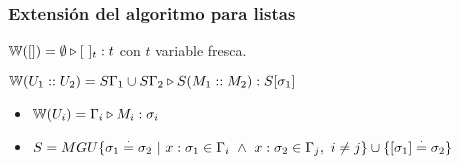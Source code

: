 \subsubsection{Extensión del algoritmo para listas}
$\mathbb{W}([]) = \emptyset\triangleright [~]_{t} : t$ con $t$ variable fresca.

$\mathbb{W}(U_1::U_2) = S\Gamma_1\cup S\Gamma_2\triangleright S(M_1::M_2) : S[\sigma_1]$

\begin{centrado}
\begin{itemize}
    \item $\mathbb{W}(U_i) = \Gamma_i\triangleright M_i : \sigma_i$
    \item $S = MGU\{\sigma_1\overset{\cdot}{=} \sigma_2~|~x:\sigma_1\in\Gamma_i~\land~x:\sigma_2\in\Gamma_j,~i\neq j\}\cup\{[\sigma_1]\overset{\cdot}{=}\sigma_2\} $
\end{itemize}
\end{centrado}





